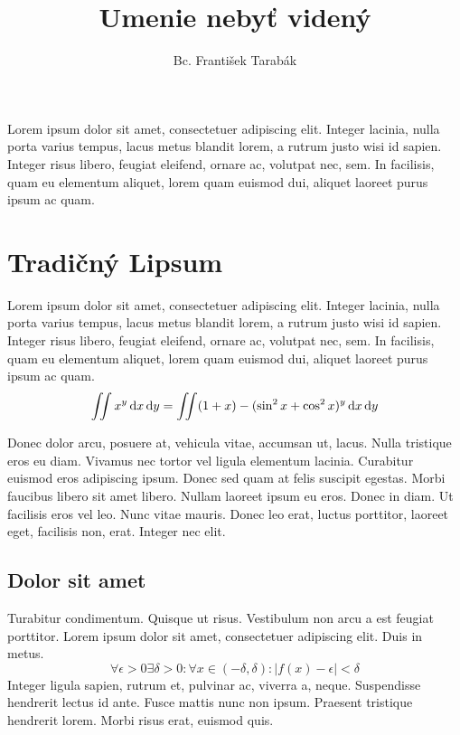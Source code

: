 \documentclass[thesismargins, thesislinespacing, twoside, openright, upjsfrontpage]{rnthesis}
\title{Umenie nebyť videný}
\author{Bc. František Tarabák}
\begin{document}
\maketitle
\newpage
\tableofcontents
\listoffigures
\listoftables

\uvod

Lorem ipsum dolor sit amet, consectetuer adipiscing elit.
Integer lacinia, nulla porta varius tempus, lacus metus blandit
lorem, a rutrum justo wisi id sapien. Integer risus libero,
feugiat eleifend, ornare ac, volutpat nec, sem. In facilisis,
quam eu elementum aliquet, lorem quam euismod dui, aliquet
laoreet purus ipsum ac quam. 


\chapter{Tradičný Lipsum}

Lorem ipsum dolor sit amet, consectetuer adipiscing elit.
Integer lacinia, nulla porta varius tempus, lacus metus blandit
lorem, a rutrum justo wisi id sapien. Integer risus libero,
feugiat eleifend, ornare ac, volutpat nec, sem. In facilisis,
quam eu elementum aliquet, lorem quam euismod dui, aliquet
laoreet purus ipsum ac quam. 
%
$$\int\!\!\!\int x^y\,{\rm d}x\,{\rm d}y = \int\!\!\!\int (1 + x) - (\sin^2 x + \cos^2 x)^y\,{\rm d}x\,{\rm d}y$$

Donec dolor arcu, posuere at, vehicula vitae, accumsan ut,
lacus. Nulla tristique eros eu diam. Vivamus nec tortor vel
ligula elementum lacinia. Curabitur euismod eros adipiscing
ipsum. Donec sed quam at felis suscipit egestas. Morbi faucibus
libero sit amet libero. Nullam laoreet ipsum eu eros. Donec in
diam. Ut facilisis eros vel leo. Nunc vitae mauris. Donec leo
erat, luctus porttitor, laoreet eget, facilisis non, erat.
Integer nec elit.

\section{Dolor sit amet}

Turabitur condimentum. Quisque ut risus. Vestibulum non arcu a
est feugiat porttitor. Lorem ipsum dolor sit amet, consectetuer
adipiscing elit. Duis in metus. 
%
$$\forall \epsilon>0 \exists \delta>0:\forall x\in(-\delta,\delta):|f(x)-\epsilon|<\delta$$
%
Integer ligula sapien, rutrum et, pulvinar ac, viverra a,
neque. Suspendisse hendrerit lectus id ante. Fusce mattis nunc
non ipsum. Praesent tristique hendrerit lorem. Morbi risus
erat, euismod quis.
\end{document}
